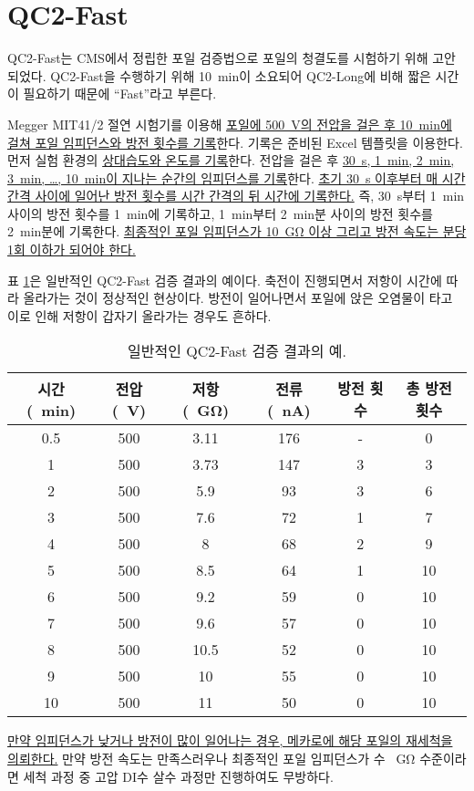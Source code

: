 \section{QC2-Fast} \label{sec:qc2_fast}
QC2-Fast는 CMS에서 정립한 포일 검증법으로 포일의 청결도를 시험하기 위해 고안되었다. QC2-Fast을 수행하기 위해 \SI{10}{\minute}이 소요되어 QC2-Long에 비해 짧은 시간이 필요하기 때문에 ``Fast''라고 부른다. 

Megger MIT41/2 절연 시험기를 이용해 \uline{포일에 \mbox{\SI{500}{\volt}}의 전압을 걸은 후 \mbox{\SI{10}{\minute}}에 걸쳐 포일 임피던스와 방전 횟수를 기록}한다. 기록은 준비된 Excel 템플릿을 이용한다. 먼저 실험 환경의 \uline{상대습도와 온도를 기록}한다. 전압을 걸은 후 \uline{\mbox{\SI{30}{\second}}, \mbox{\SI{1}{\minute}}, \mbox{\SI{2}{\minute}}, \mbox{\SI{3}{\minute}}, \dots, \mbox{\SI{10}{\minute}}이 지나는 순간의 임피던스를 기록}한다. \uline{초기 \mbox{\SI{30}{\second}} 이후부터 매 시간 간격 사이에 일어난 방전 횟수를 시간 간격의 뒤 시간에 기록한다.} 즉, \SI{30}{\second}부터 \SI{1}{\minute} 사이의 방전 횟수를 \SI{1}{\minute}에 기록하고, \SI{1}{\minute}부터 \SI{2}{\minute}분 사이의 방전 횟수를 \SI{2}{\minute}분에 기록한다. \uline{최종적인 포일 임피던스가 \mbox{\SI{10}{\giga\ohm}} 이상 그리고 방전 속도는 분당 1회 이하가 되어야 한다.}

표 \ref{tab:example_qc2_fast_result}은 일반적인 QC2-Fast 검증 결과의 예이다. 축전이 진행되면서 저항이 시간에 따라 올라가는 것이 정상적인 현상이다. 방전이 일어나면서 포일에 앉은 오염물이 타고 이로 인해 저항이 갑자기 올라가는 경우도 흔하다.

\begin{table}[htb]
\centering
\begin{tabular}{|c|c|c|c|c|c|}
\hline
 시간 (\SI{}{\minute}) & 전압(\SI{}{\volt}) & 저항 (\SI{}{\giga\ohm}) & 전류 (\SI{}{\nano\ampere}) & 방전 횟수 & 총 방전 횟수\\
\hline
0.5 & 500 & 3.11 & 176 & - & 0\\
1   & 500 & 3.73 & 147 & 3 & 3\\
2   & 500 & 5.9  & 93  & 3 & 6\\
3   & 500 & 7.6  & 72  & 1 & 7\\
4   & 500 & 8    & 68  & 2 & 9\\
5   & 500 & 8.5  & 64  & 1 & 10\\
6   & 500 & 9.2  & 59  & 0 & 10\\
7   & 500 & 9.6  & 57  & 0 & 10\\
8   & 500 & 10.5 & 52  & 0 & 10\\
9   & 500 & 10   & 55  & 0 & 10\\
10  & 500 & 11   & 50  & 0 & 10\\
\hline
\end{tabular}
\caption[일반적인 QC2-Fast 검증 결과의 예]{일반적인 QC2-Fast 검증 결과의 예.}
  \label{tab:example_qc2_fast_result}
  \end{table}

\uline{만약 임피던스가 낮거나 방전이 많이 일어나는 경우, 메카로에 해당 포일의 재세척을 의뢰한다.} 만약 방전 속도는 만족스러우나 최종적인 포일 임피던스가 수 \SI{}{\giga\ohm} 수준이라면 세척 과정 중 고압 DI수 살수 과정만 진행하여도 무방하다.


